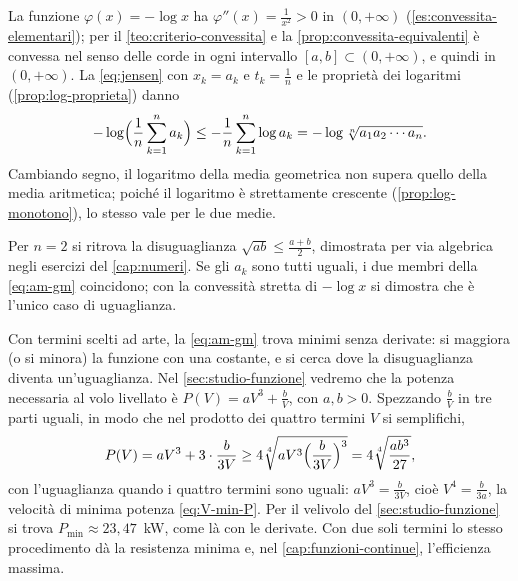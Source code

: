 \begin{dimostrazione}
La funzione $\varphi(x)=-\log x$ ha $\varphi''(x)=\frac1{x^{2}}>0$ in $(0,+\infty)$
(\cref{es:convessita-elementari}); per il \cref{teo:criterio-convessita} e la
\cref{prop:convessita-equivalenti} è convessa nel senso delle corde in ogni intervallo
$[a,b]\subset(0,+\infty)$, e quindi in $(0,+\infty)$. La \eqref{eq:jensen} con
$x_{k}=a_{k}$ e $t_{k}=\frac1n$ e le proprietà dei logaritmi (\cref{prop:log-proprieta})
danno
\[
  -\log\Bigl(\frac1n\sum_{k=1}^{n}a_{k}\Bigr)\le-\frac1n\sum_{k=1}^{n}\log a_{k}
  =-\log\sqrt[n]{a_{1}a_{2}\cdots a_{n}} .
\]
Cambiando segno, il logaritmo della media geometrica non supera quello della media
aritmetica; poiché il logaritmo è strettamente crescente (\cref{prop:log-monotono}), lo
stesso vale per le due medie.
\end{dimostrazione}

Per $n=2$ si ritrova la disuguaglianza $\sqrt{ab}\le\frac{a+b}2$, dimostrata per via
algebrica negli esercizi del \cref{cap:numeri}. Se gli $a_{k}$ sono tutti uguali, i due
membri della \eqref{eq:am-gm} coincidono; con la convessità stretta di $-\log x$ si
dimostra che è l'unico caso di uguaglianza.

\begin{esempio}\label{es:potenza-am-gm}
Con termini scelti ad arte, la \eqref{eq:am-gm} trova minimi senza derivate: si maggiora
(o si minora) la funzione con una costante, e si cerca dove la disuguaglianza diventa
un'uguaglianza. Nel \cref{sec:studio-funzione} vedremo che la potenza necessaria al volo
livellato è $P(V)=aV^{3}+\frac bV$, con $a,b>0$. Spezzando $\frac bV$ in tre parti uguali,
in modo che nel prodotto dei quattro termini $V$ si semplifichi,
\[
  P(V)=aV^{3}+3\cdot\frac{b}{3V}\ge4\sqrt[4]{aV^{3}\Bigl(\frac{b}{3V}\Bigr)^{3}}
  =4\sqrt[4]{\frac{ab^{3}}{27}} ,
\]
con l'uguaglianza quando i quattro termini sono uguali: $aV^{3}=\frac{b}{3V}$, cioè
$V^{4}=\frac{b}{3a}$, la velocità di minima potenza \eqref{eq:V-min-P}. Per il velivolo
del \cref{sec:studio-funzione} si trova $P_{\min}\approx23{,}47$~kW, come là con le
derivate. Con due soli termini lo stesso procedimento dà la resistenza minima e, nel
\cref{cap:funzioni-continue}, l'efficienza massima.
\end{esempio}

